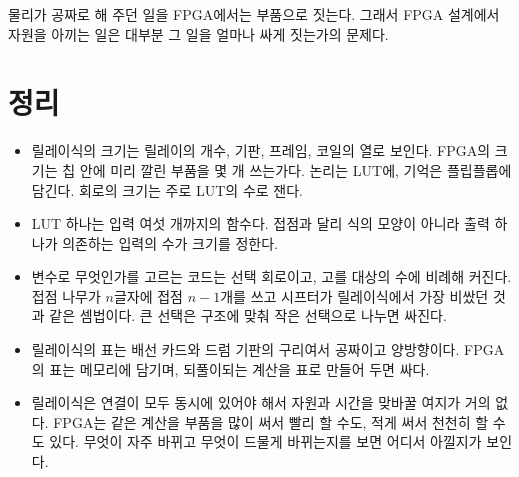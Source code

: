 물리가 공짜로 해 주던 일을 FPGA에서는 부품으로 짓는다. 그래서 FPGA 설계에서 자원을 아끼는 일은 대부분 그
일을 얼마나 싸게 짓는가의 문제다.

\section{정리}

\begin{itemize}
\item 릴레이식의 크기는 릴레이의 개수, 기판, 프레임, 코일의 열로 보인다. FPGA의 크기는 칩 안에 미리 깔린
부품을 몇 개 쓰는가다. 논리는 LUT에, 기억은 플립플롭에 담긴다. 회로의 크기는 주로 LUT의 수로 잰다.
\item LUT 하나는 입력 여섯 개까지의 함수다. 접점과 달리 식의 모양이 아니라 출력 하나가 의존하는 입력의 수가
크기를 정한다.
\item 변수로 무엇인가를 고르는 코드는 선택 회로이고, 고를 대상의 수에 비례해 커진다. 접점 나무가 $n$글자에
접점 $n-1$개를 쓰고 시프터가 릴레이식에서 가장 비쌌던 것과 같은 셈법이다. 큰 선택은 구조에 맞춰 작은 선택으로
나누면 싸진다.
\item 릴레이식의 표는 배선 카드와 드럼 기판의 구리여서 공짜이고 양방향이다. FPGA의 표는 메모리에 담기며,
되풀이되는 계산을 표로 만들어 두면 싸다.
\item 릴레이식은 연결이 모두 동시에 있어야 해서 자원과 시간을 맞바꿀 여지가 거의 없다. FPGA는 같은 계산을
부품을 많이 써서 빨리 할 수도, 적게 써서 천천히 할 수도 있다. 무엇이 자주 바뀌고 무엇이 드물게 바뀌는지를
보면 어디서 아낄지가 보인다.
\end{itemize}
